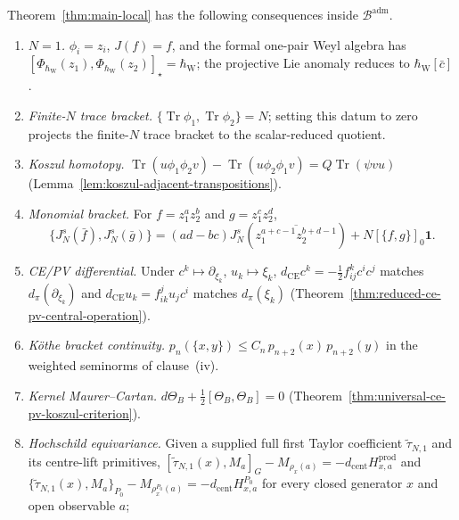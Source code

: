 \documentclass[11pt]{memoir}
\begin{document}
\begin{rmk}\label{rmk:consistency-checks}
  Theorem~\ref{thm:main-local} has the following consequences inside
  $\mathcal B^{\mathrm{adm}}$.
  \begin{enumerate}[label=\textup{(\arabic*)}]
    \item \emph{$N=1$.}  $\phi_i=z_i$, $J(f)=f$, and the formal
      one-pair Weyl algebra has
      $[\Phi_{\hbar_{\mathrm{W}}}(z_1),
      \Phi_{\hbar_{\mathrm{W}}}(z_2)]_\star=\hbar_{\mathrm{W}}$; the projective
      Lie anomaly reduces to $\hbar_{\mathrm{W}}[\bar c]$.
    \item \emph{Finite-$N$ trace bracket.}
      $\{\operatorname{Tr}\phi_1,\operatorname{Tr}\phi_2\}=N$;
      setting this datum to zero projects the finite-\(N\) trace bracket
      to the scalar-reduced quotient.
    \item \emph{Koszul homotopy.}
      $\operatorname{Tr}(u\phi_1\phi_2v)-\operatorname{Tr}(u\phi_2\phi_1v)
      =Q\operatorname{Tr}(\psi vu)$
      (Lemma~\ref{lem:koszul-adjacent-transpositions}).
    \item \emph{Monomial bracket.}
      For \(f=z_1^az_2^b\) and \(g=z_1^cz_2^d\),
      \[
        \{J_N^s(\bar f),J_N^s(\bar g)\}
        =(ad-bc)J_N^s\!\left(
          \overline{z_1^{a+c-1}z_2^{b+d-1}}\right)
          +N[\{f,g\}]_0\mathbf1.
      \]
    \item \emph{CE/PV differential.}  Under
      $c^k\mapsto\partial_{\xi_k}$, $u_k\mapsto\xi_k$,
      $d_{\mathrm{CE}}c^k=-\tfrac12 f^k_{ij}c^ic^j$ matches
      $d_\pi(\partial_{\xi_k})$ and
      $d_{\mathrm{CE}}u_k=f^j_{ik}u_jc^i$ matches $d_\pi(\xi_k)$
      (Theorem~\ref{thm:reduced-ce-pv-central-operation}).
    \item \emph{Köthe bracket continuity.}
      $p_n(\{x,y\})\leq C_n\,p_{n+2}(x)\,p_{n+2}(y)$ in the
      weighted seminorms of clause~(iv).
    \item \emph{Kernel Maurer--Cartan.}
      $d\Theta_B+\tfrac12[\Theta_B,\Theta_B]=0$
      (Theorem~\ref{thm:universal-ce-pv-koszul-criterion}).
    \item \emph{Hochschild equivariance.}
      Given a supplied full first Taylor coefficient
      \(\widetilde\tau_{N,1}\) and its centre-lift primitives,
      $[\widetilde\tau_{N,1}(x),M_a]_G-M_{\rho_x(a)}
      =-d_{\mathrm{cent}}H^{\mathrm{prod}}_{x,a}$ and
      $\{\widetilde\tau_{N,1}(x),M_a\}_{P_0}
      -M_{\rho_x^{P_0}(a)}
      =-d_{\mathrm{cent}}H^{P_0}_{x,a}$
      for every closed generator $x$ and open observable $a$;

\end{enumerate}
\end{rmk}
\end{document}
